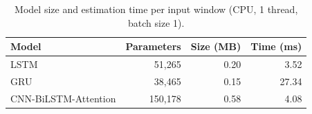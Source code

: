 \begin{table}[t]
\centering
\caption{Model size and estimation time per input window (CPU, 1 thread, batch size 1).}
\label{tab:model_size}
\begin{tabular}{lrrr}
\toprule
Model & Parameters & Size (MB) & Time (ms) \\
\midrule
LSTM & 51,265 & 0.20 & 3.52 \\
GRU & 38,465 & 0.15 & 27.34 \\
CNN-BiLSTM-Attention & 150,178 & 0.58 & 4.08 \\
\bottomrule
\end{tabular}
\end{table}